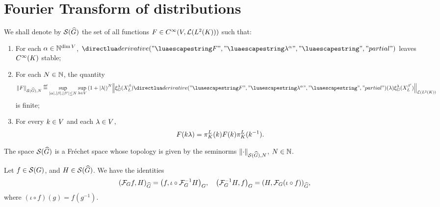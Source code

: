 \section{Fourier Transform of distributions}

\begin{definition}
    We shall denote by $\Schwartz{\dualGroup\Group}$
    the set of all functions $F \in \SmoothFunctions{\VectorSpace, \Lin{\Lebesgue{2}\CompactGroup}}$ such that:
    \begin{enumerate}
        \item For each $\alpha \in \N^{\dim \VectorSpace}$,
            $\D[F]{\lambda^\alpha}$ leaves $\SmoothFunctions\CompactGroup$ stable;
        \item For each $N \in \N$, the quantity
            \begin{align*}
                \seminorm[\Schwartz{\dualGroup\Group}]{N}{F} \defeq
                \sup_{\abs\alpha, \abs\beta, \abs{\beta'} \leq N}
                \sup_{\lambda \in \VectorSpace}
                {(1 + \abs\lambda)}^N
                \norm[\Lin{\Lebesgue{2}\CompactGroup}]{%
                    \Rep\lambda(\LeftDifferentialOperator\beta)
                    \D[F]{\lambda^\alpha}(\lambda)
                    \Rep\lambda(\LeftDifferentialOperator{\beta'})
                }
            \end{align*}
            is finite;
        \item For every $k \in \VectorSpace$ and each $\lambda \in \VectorSpace$,
            \begin{align*}
                F(k \lambda) = \LeftRegularRepresentation(k) F(k) \LeftRegularRepresentation(k^{-1}).
            \end{align*}
    \end{enumerate}
\end{definition}

\begin{lemma}
    The space $\Schwartz{\dualGroup\Group}$ is a Fr\'echet space
    whose topology is given by the seminorms $\seminorm[\Schwartz{\dualGroup\Group}]{N}{\dummy}$, $N \in \N$.
\end{lemma}

\begin{proposition}
    Let $f \in \Schwartz\Group$, and $H \in \Schwartz{\dualGroup\Group}$.
    We have the identities
    \begin{align*}
        \ip[\dualGroup\Group]{\Fourier f}{H}
        = \ip[\Group]{f}{\iota \circ \InverseFourier H},\quad
        \ip[\Group]{\InverseFourier H}{f}
        = \ip[\dualGroup\Group]{H}{\Fourier (\iota \circ f)},
    \end{align*}
    where $(\iota \circ f)(g) = f(g^{-1})$.
\end{proposition}

